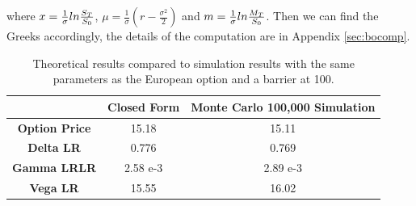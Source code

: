 \documentclass[11pt,a4paper,fleqn]{article}
\begin{document}
where $x = {1\over \sigma}ln {S_T\over S_0}$, $\mu=\frac{1}{\sigma}(r-\frac{\sigma^2}{2})$ and $m = {1\over \sigma}ln {M_T\over S_0}$. Then we can find the Greeks accordingly, the details of the computation are in Appendix \ref{sec:bocomp}.\\


\begin{table}
\centering
\begin{tabular}{|c|c|c|}
\hline
     & \textbf{Closed Form} & \textbf{Monte Carlo 100,000 Simulation}\\ \hline
\textbf{Option Price} & 15.18 & 15.11 \\ \hline
\textbf{Delta LR} & 0.776 & 0.769\\ \hline
\textbf{Gamma LRLR} & 2.58 e-3 & 2.89 e-3\\ \hline
\textbf{Vega LR} &15.55 &16.02\\ \hline
\end{tabular}
\caption{Theoretical results compared to simulation results with the same parameters as the European option and a barrier at 100.}
\end{table}
\end{document}
